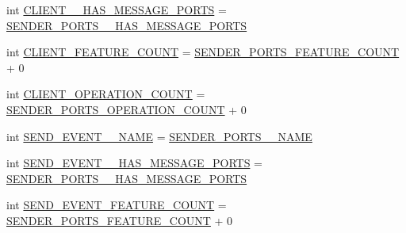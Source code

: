 \begin{DoxyCompactItemize}
\item 
int \hyperlink{interfaceshootingmachineemfmodel_1_1_shootingmachineemfmodel_package_a202487038e6af15ca1b3bb8742010a8e}{C\-L\-I\-E\-N\-T\-\_\-\-\_\-\-H\-A\-S\-\_\-\-M\-E\-S\-S\-A\-G\-E\-\_\-\-P\-O\-R\-T\-S} = \hyperlink{interfaceshootingmachineemfmodel_1_1_shootingmachineemfmodel_package_a32f9aba86ce59940c62b442308c4bf7d}{S\-E\-N\-D\-E\-R\-\_\-\-P\-O\-R\-T\-S\-\_\-\-\_\-\-H\-A\-S\-\_\-\-M\-E\-S\-S\-A\-G\-E\-\_\-\-P\-O\-R\-T\-S}
\item 
int \hyperlink{interfaceshootingmachineemfmodel_1_1_shootingmachineemfmodel_package_a88a105d8acaabeff58394a5218719930}{C\-L\-I\-E\-N\-T\-\_\-\-F\-E\-A\-T\-U\-R\-E\-\_\-\-C\-O\-U\-N\-T} = \hyperlink{interfaceshootingmachineemfmodel_1_1_shootingmachineemfmodel_package_a9db4c8b36712714f6168acc0e9fae4fa}{S\-E\-N\-D\-E\-R\-\_\-\-P\-O\-R\-T\-S\-\_\-\-F\-E\-A\-T\-U\-R\-E\-\_\-\-C\-O\-U\-N\-T} + 0
\item 
int \hyperlink{interfaceshootingmachineemfmodel_1_1_shootingmachineemfmodel_package_a291c3d883d4c792e13bacc79262dc76e}{C\-L\-I\-E\-N\-T\-\_\-\-O\-P\-E\-R\-A\-T\-I\-O\-N\-\_\-\-C\-O\-U\-N\-T} = \hyperlink{interfaceshootingmachineemfmodel_1_1_shootingmachineemfmodel_package_ad4c59f12e4631c8b76762f9e81227dce}{S\-E\-N\-D\-E\-R\-\_\-\-P\-O\-R\-T\-S\-\_\-\-O\-P\-E\-R\-A\-T\-I\-O\-N\-\_\-\-C\-O\-U\-N\-T} + 0
\item 
int \hyperlink{interfaceshootingmachineemfmodel_1_1_shootingmachineemfmodel_package_a853cae4d90f2fe3f4b43c19d24c6df5d}{S\-E\-N\-D\-\_\-\-E\-V\-E\-N\-T\-\_\-\-\_\-\-N\-A\-M\-E} = \hyperlink{interfaceshootingmachineemfmodel_1_1_shootingmachineemfmodel_package_a399a22f7885ad9687ceee392efd75115}{S\-E\-N\-D\-E\-R\-\_\-\-P\-O\-R\-T\-S\-\_\-\-\_\-\-N\-A\-M\-E}
\item 
int \hyperlink{interfaceshootingmachineemfmodel_1_1_shootingmachineemfmodel_package_ac31f545cdd504a45890a4d2f6dd739a1}{S\-E\-N\-D\-\_\-\-E\-V\-E\-N\-T\-\_\-\-\_\-\-H\-A\-S\-\_\-\-M\-E\-S\-S\-A\-G\-E\-\_\-\-P\-O\-R\-T\-S} = \hyperlink{interfaceshootingmachineemfmodel_1_1_shootingmachineemfmodel_package_a32f9aba86ce59940c62b442308c4bf7d}{S\-E\-N\-D\-E\-R\-\_\-\-P\-O\-R\-T\-S\-\_\-\-\_\-\-H\-A\-S\-\_\-\-M\-E\-S\-S\-A\-G\-E\-\_\-\-P\-O\-R\-T\-S}
\item 
int \hyperlink{interfaceshootingmachineemfmodel_1_1_shootingmachineemfmodel_package_a8417b6cf6b8d9fdbaab4d15a74c2b111}{S\-E\-N\-D\-\_\-\-E\-V\-E\-N\-T\-\_\-\-F\-E\-A\-T\-U\-R\-E\-\_\-\-C\-O\-U\-N\-T} = \hyperlink{interfaceshootingmachineemfmodel_1_1_shootingmachineemfmodel_package_a9db4c8b36712714f6168acc0e9fae4fa}{S\-E\-N\-D\-E\-R\-\_\-\-P\-O\-R\-T\-S\-\_\-\-F\-E\-A\-T\-U\-R\-E\-\_\-\-C\-O\-U\-N\-T} + 0

\end{DoxyCompactItemize}
